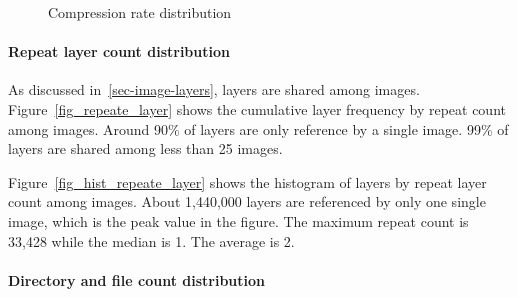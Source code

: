 \begin{figure}[!t]
	\centering
	\caption{Compression rate distribution}
	\label{fig-repeat-layer-cnt}
\end{figure}

\paragraph{Repeat layer count distribution}

As discussed in~\ref{sec-image-layers}, layers are shared among images. Figure~\ref{fig_repeate_layer} shows the cumulative layer frequency by repeat count among images. Around 90\% of layers are only reference by a single image. 99\% of layers are shared among less than 25 images. 

Figure~\ref{fig_hist_repeate_layer} shows the histogram of layers by repeat layer count among images. About 1,440,000 layers are referenced by only one single image, which is the peak value in the figure. The maximum repeat count is 33,428 while the median is 1. The average is 2.

\paragraph{Directory and file count distribution}

